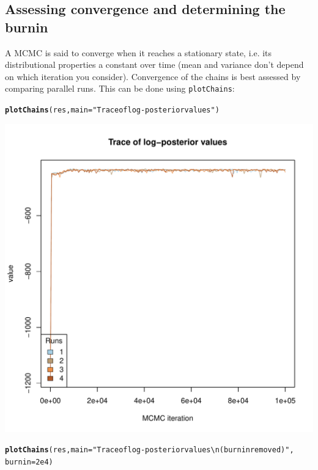 \documentclass{article}\usepackage[]{graphicx}\usepackage[]{color}
\makeatletter
\newcommand{\hlnum}[1]{\textcolor[rgb]{0.686,0.059,0.569}{#1}}%
\newcommand{\hlstr}[1]{\textcolor[rgb]{0.192,0.494,0.8}{#1}}%
\newcommand{\hlstd}[1]{\textcolor[rgb]{0.345,0.345,0.345}{#1}}%
\newcommand{\hlkwc}[1]{\textcolor[rgb]{0.333,0.667,0.333}{#1}}%
\newcommand{\hlkwd}[1]{\textcolor[rgb]{0.737,0.353,0.396}{\textbf{#1}}}%
\newenvironment{kframe}{%
 \def\at@end@of@kframe{}%
 \ifinner\ifhmode%
  \def\at@end@of@kframe{\end{minipage}}%
  \begin{minipage}{\columnwidth}%
 \fi\fi%
 \def\FrameCommand##1{\hskip\@totalleftmargin \hskip-\fboxsep
 \colorbox{shadecolor}{##1}\hskip-\fboxsep
     \hskip-\linewidth \hskip-\@totalleftmargin \hskip\columnwidth}%
 \MakeFramed {\advance\hsize-\width
   \@totalleftmargin\z@ \linewidth\hsize
   \@setminipage}}%
 {\par\unskip\endMakeFramed%
 \at@end@of@kframe}
\newenvironment{knitrout}{}{} %
\makeatother
\begin{document}
\subsection{Assessing convergence and determining the burnin}

A MCMC is said to converge when it reaches a stationary state, i.e. its distributional properties a
constant over time (mean and variance don't depend on which iteration you consider).
Convergence of the chains is best assessed by comparing parallel runs.
This can be done using \texttt{plotChains}:

\begin{knitrout}
\color{fgcolor}\begin{kframe}
\begin{alltt}
\hlkwd{plotChains}\hlstd{(res,} \hlkwc{main}\hlstd{=}\hlstr{"Trace of log-posterior values"}\hlstd{)}
\end{alltt}
\end{kframe}

{\centering \includegraphics[width=.6\textwidth]{figs/unnamed-chunk-101} 

}


\begin{kframe}\begin{alltt}
\hlkwd{plotChains}\hlstd{(res,} \hlkwc{main}\hlstd{=}\hlstr{"Trace of log-posterior values \textbackslash{}n(burnin removed)"}\hlstd{,}
           \hlkwc{burnin}\hlstd{=}\hlnum{2e4}\hlstd{)}
\end{alltt}
\end{kframe}


\end{knitrout}
\end{document}
